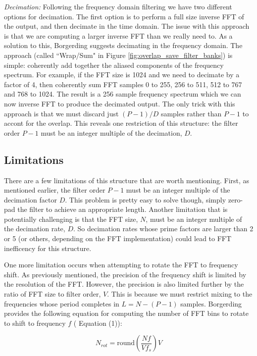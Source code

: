 \documentclass[12pt]{report}
\begin{document}
\emph{Decimation:} Following the frequency domain filtering we have two
different options for decimation. The first option is to perform a full size
inverse FFT of the output, and then decimate in the time domain. The issue with
this approach is that we are computing a larger inverse FFT than we really need
to. As a solution to this, Borgerding suggests decimating in the frequency
domain. The approach (called ``Wrap/Sum" in Figure
\ref{fig:overlap_save_filter_banks}) is simple: coherently add together the aliased
components of the frequency spectrum.  For example, if the FFT size is 1024 and
we need to decimate by a factor of 4, then coherently sum FFT samples 0 to 255,
256 to 511, 512 to 767 and 768 to 1024.  The result is a 256 sample frequency
spectrum which we can now inverse FFT to produce the decimated output. The only
trick with this approach is that we must discard just $(P-1)/D$ samples rather
than $P-1$ to accont for the overlap.  This reveals one restriction of this
structure: the filter order $P-1$ must be an integer multiple of the
decimation, $D$.

\subsection{Limitations}
\label{sec:os_limitations}
There are a few limitations of this structure that are worth mentioning. First,
as mentioned earlier, the filter order $P-1$ must be an integer multiple of the
decimation factor $D$. This problem is pretty easy to solve though, simply
zero-pad the filter to achieve an appropriate length. Another limitation that
is potentially challenging is that the FFT size, $N$, must be an integer
multiple of the decimation rate, $D$. So decimation rates whose prime factors
are larger than 2 or 5 (or others, depending on the FFT implementation) could
lead to FFT inefficency for this structure.

One more limitation occurs when attempting to rotate the FFT to frequency shift.
As previously mentioned, the precision of the frequency shift is limited by the
resolution of the FFT. However, the precision is also limited further by the
ratio of FFT size to filter order, $V$. This is because we must restrict mixing
to the frequencies whose period completes in $L=N-(P-1)$ samples. Borgerding
provides the following equation for computing the number of FFT bins to rotate
to shift to frequency $f$ (\cite{Borgerding1} Equation (1)):

\begin{equation*}
    N_{rot} = \text{round}\left( \frac{Nf}{Vf_s} \right) V
\end{equation*}
\end{document}
